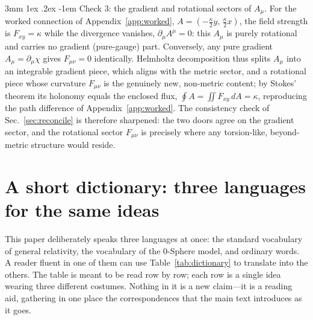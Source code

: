 \documentclass[%
 reprint, amsmath,amssymb, aps, prb, ]{revtex4-2}
\makeatletter
\numberwithin{equation}{section}
\renewcommand\paragraph{%
  \@startsection{paragraph}{4}{\z@}%
    {3mm \@plus 1ex \@minus .2ex}%
    {-1em}%
    {\normalfont\normalsize\itshape}}
\makeatother
\begin{document}
\paragraph{Check 3: the gradient and rotational sectors of $A_\mu$.}
For the worked connection of Appendix~\ref{app:worked}, $A=(-\tfrac{\kappa}{2}y,\,\tfrac{\kappa}{2}x)$, the field strength is $F_{xy}=\kappa$ while the divergence vanishes, $\partial_\mu A^\mu=0$: this $A_\mu$ is purely rotational and carries no gradient (pure-gauge) part. Conversely, any pure gradient $A_\mu=\partial_\mu\chi$ gives $F_{\mu\nu}=0$ identically. Helmholtz decomposition thus splits $A_\mu$ into an integrable gradient piece, which aligns with the metric sector, and a rotational piece whose curvature $F_{\mu\nu}$ is the genuinely new, non-metric content; by Stokes' theorem its holonomy equals the enclosed flux, $\oint A=\iint F_{xy}\,dA=\kappa$, reproducing the path difference of Appendix~\ref{app:worked}. The consistency check of Sec.~\ref{sec:reconcile} is therefore sharpened: the two doors agree on the gradient sector, and the rotational sector $F_{\mu\nu}$ is precisely where any torsion-like, beyond-metric structure would reside.

\section{A short dictionary: three languages for the same ideas}
\label{app:dictionary}

This paper deliberately speaks three languages at once: the standard vocabulary of general relativity, the vocabulary of the 0-Sphere model, and ordinary words. A reader fluent in one of them can use Table~\ref{tab:dictionary} to translate into the others. The table is meant to be read row by row; each row is a single idea wearing three different costumes. Nothing in it is a new claim---it is a reading aid, gathering in one place the correspondences that the main text introduces as it goes.
\end{document}
